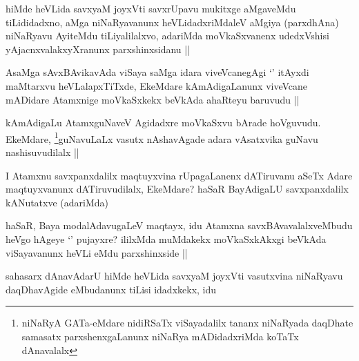\begin{artha}
hiMde heVLida savxyaM joyxVti savxrUpavu mukitxge aMgaveMdu tiLididadxno, aMga niNaRyavanunx heVLidadxriMdaleV aMgiya (parxdhAna) niNaRyavu AyiteMdu tiLiyalilalxvo, adariMda moVkaSxvanenx udedxVshisi yAjacnxvalakxyXranunx parxshinxsidanu ||
\end{artha}


\begin{artha}
AsaMga sAvxBAvikavAda viSaya saMga idara viveVcanegAgi `\stext' itAyxdi maMtarxvu heVLalapxTiTxde, EkeMdare kAmAdigaLanunx viveVcane mADidare Atamxnige moVkaSxkekx beVkAda ahaRteyu baruvudu ||
\end{artha}

\begin{artha}
kAmAdigaLu AtamxguNaveV Agidadxre moVkaSxvu bArade hoVguvudu. EkeMdare, \footnote[1]{niNaRyA GATa-eMdare nidiRSaTx viSayadalilx tananx niNaRyada daqDhate samasatx parxshenxgaLanunx niNaRya mADidadxriMda koTaTx dAnavalalx}guNavuLaLx vasutx nAshavAgade adara vAsatxvika guNavu nashisuvudilalx ||
\end{artha}


\begin{artha}
I Atamxnu savxpanxdalilx maqtuyxvina rUpagaLanenx dATiruvanu aSeTx Adare maqtuyxvanunx dATiruvudilalx, EkeMdare? haSaR BayAdigaLU savxpanxdalilx kANutatxve (adariMda)
\end{artha}


\begin{artha}
haSaR, Baya modalAdavugaLeV maqtayx, idu Atamxna savxBAvavalalxveMbudu heVgo hAgeye `\stext' pujayxre? ililxMda muMdakekx moVkaSxkAkxgi beVkAda viSayavanunx heVLi eMdu parxshinxside ||
\end{artha}


\begin{artha}
sahasarx dAnavAdarU hiMde heVLida savxyaM joyxVti vasutxvina niNaRyavu daqDhavAgide eMbudanunx tiLisi idadxkekx, idu
\end{artha}


